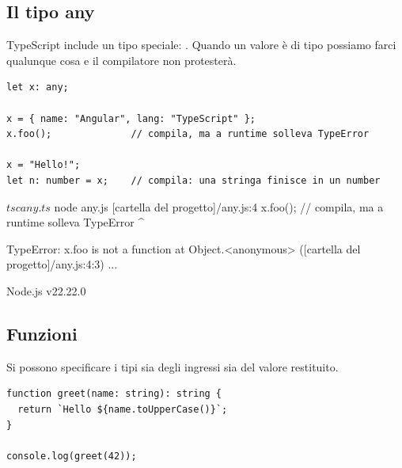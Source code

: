 \subsection{Il tipo any}

TypeScript include un tipo speciale: . Quando un valore è di tipo
 possiamo farci qualunque cosa e il compilatore non protesterà.

\begin{lstlisting}[style=ts, name=any.ts]
let x: any;

x = { name: "Angular", lang: "TypeScript" };
x.foo();              // compila, ma a runtime solleva TypeError

x = "Hello!";
let n: number = x;    // compila: una stringa finisce in un number
\end{lstlisting}

\begin{console}[Terminale]
$ tsc any.ts
$ node any.js
[cartella del progetto]/any.js:4
x.foo(); // compila, ma a runtime solleva TypeError
  ^

TypeError: x.foo is not a function
    at Object.<anonymous> ([cartella del progetto]/any.js:4:3)
    ...

Node.js v22.22.0
\end{console}


\subsection{Funzioni}

Si possono specificare i tipi sia degli ingressi sia del valore restituito.

\begin{lstlisting}[style=ts, name=functions.ts]
function greet(name: string): string {
  return `Hello ${name.toUpperCase()}`;
}

console.log(greet(42));
\end{lstlisting}


